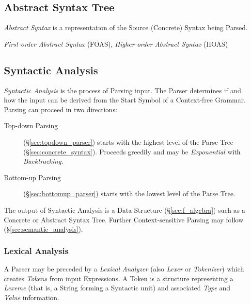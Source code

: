 \subsection{Abstract Syntax Tree}\label{sec:abstract_syntax}

\emph{Abstract Syntax} is a representation of the Source (Concrete)
Syntax being Parsed.

\emph{First-order Abstract Syntax} (FOAS), \emph{Higher-order Abstract
  Syntax} (HOAS)



\subsection{Syntactic Analysis}\label{sec:syntactic_analysis}

\emph{Syntactic Analysis} is the process of Parsing input. The Parser
determines if and how the input can be derived from the Start Symbol
of a Context-free Grammar. Parsing can proceed in two directions:
\begin{description}
\item [Top-down Parsing] (\S\ref{sec:topdown_parser}) starts with
  the highest level of the Parse Tree (\S\ref{sec:concrete_syntax}).
  Proceeds greedily and may be \emph{Exponential} with
  \emph{Backtracking}.
\item [Bottom-up Parsing] (\S\ref{sec:bottomup_parser}) starts with
  the lowest level of the Parse Tree.
\end{description}
The output of Syntactic Analysis is a Data Structure
(\S\ref{sec:f_algebra}) such as a Concrete or Abstract Syntax Tree.
Further Context-sensitive Parsing may follow
(\S\ref{sec:semantic_analysis}).



\subsubsection{Lexical Analysis}\label{sec:lexical_analysis}

A Parser may be preceded by a \emph{Lexical Analyzer} (also
\emph{Lexer} or \emph{Tokenizer}) which creates \emph{Tokens} from
input Expressions. A Token is a structure representing a \emph{Lexeme}
(that is, a String forming a Syntactic unit) and associated
\emph{Type} and \emph{Value} information.

